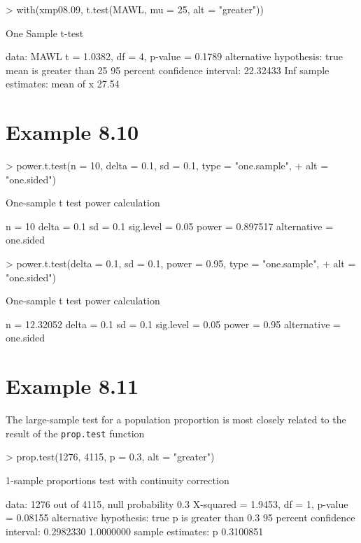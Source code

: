 \documentclass{book}
\begin{document}
\begin{Schunk}
\begin{Sinput}
> with(xmp08.09, t.test(MAWL, mu = 25, alt = "greater"))
\end{Sinput}
\begin{Soutput}
	One Sample t-test

data:  MAWL 
t = 1.0382, df = 4, p-value = 0.1789
alternative hypothesis: true mean is greater than 25 
95 percent confidence interval:
 22.32433      Inf 
sample estimates:
mean of x 
    27.54 
\end{Soutput}
\end{Schunk}

\section{Example 8.10}
\label{sec:xmp0810}

\begin{Schunk}
\begin{Sinput}
> power.t.test(n = 10, delta = 0.1, sd = 0.1, type = "one.sample", 
+     alt = "one.sided")
\end{Sinput}
\begin{Soutput}
     One-sample t test power calculation 

              n = 10
          delta = 0.1
             sd = 0.1
      sig.level = 0.05
          power = 0.897517
    alternative = one.sided
\end{Soutput}
\begin{Sinput}
> power.t.test(delta = 0.1, sd = 0.1, power = 0.95, type = "one.sample", 
+     alt = "one.sided")
\end{Sinput}
\begin{Soutput}
     One-sample t test power calculation 

              n = 12.32052
          delta = 0.1
             sd = 0.1
      sig.level = 0.05
          power = 0.95
    alternative = one.sided
\end{Soutput}
\end{Schunk}

\section{Example 8.11}
\label{sec:xmp0810}

The large-sample test for a population proportion is most closely
related to the result of the \texttt{prop.test} function
\begin{Schunk}
\begin{Sinput}
> prop.test(1276, 4115, p = 0.3, alt = "greater")
\end{Sinput}
\begin{Soutput}
	1-sample proportions test with continuity correction

data:  1276 out of 4115, null probability 0.3 
X-squared = 1.9453, df = 1, p-value = 0.08155
alternative hypothesis: true p is greater than 0.3 
95 percent confidence interval:
 0.2982330 1.0000000 
sample estimates:
        p 
0.3100851 
\end{Soutput}
\end{Schunk}
\end{document}
